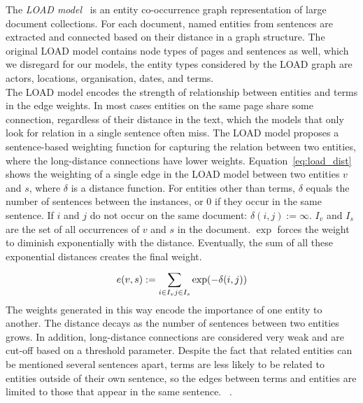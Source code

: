 The \emph{LOAD model}~ is an entity co-occurrence graph representation of large document collections. For each document, named entities from sentences are extracted and connected based on their distance in a graph structure. The original LOAD model contains node types of pages and sentences as well, which we disregard for our models, the entity types considered by the LOAD graph are actors, locations, organisation, dates, and terms.\\
The LOAD model encodes the strength of relationship between entities and terms in the edge weights. In most cases entities on the same page share some connection, regardless of their distance in the text, which the models that only look for relation in a single sentence often miss. The LOAD model proposes a sentence-based weighting function for capturing the relation between two entities, where the long-distance connections have lower weights. Equation~\ref{eq:load_dist} shows the weighting of a single edge in the LOAD model between two entities $v$ and $s$, where $\delta $ is a distance function. For entities other than terms, $\delta $ equals the number of sentences between the instances, or $0$ if they occur in the same sentence.
If $i$ and $ j$ do not occur on the same document: $ \delta(i, j) := \infty$. $ I_{ v }$ and $I_{ s } $ are the set of all occurrences of $v$ and $s$ in the document. $\exp$ forces the weight to diminish exponentially with the distance. Eventually, the sum of all these exponential distances creates the final weight.
\begin{equation}
e (v,s) :=\sum _{ i\in I_{ v } \\ j\in I_{ s } }^{  }{ \exp } (-\delta (i,j))
\label{eq:load_dist}
\end{equation}
The weights generated in this way encode the importance of one entity to another. The distance decays as the number of sentences between two entities grows. In addition, long-distance connections are considered very weak and are cut-off based on a threshold parameter. 
Despite the fact that related entities can be mentioned several sentences apart, terms are less likely to be related to entities outside of their own sentence, so the edges between terms and entities are limited to those that appear in the same sentence. ~. 
